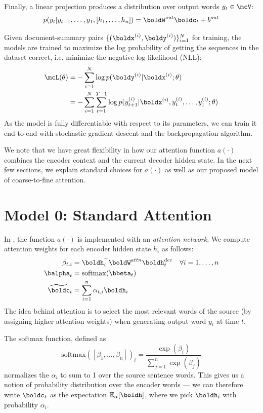 \documentclass[12pt]{report}
\begin{document}
Finally, a linear projection produces a distribution over output words $y_t \in \mcV$:
\begin{equation}
p(y_t | y_{t-1}, \ldots, y_1, [h_1, \ldots, h_n]) = \boldW^{out}\boldc_t + b^{out}
\end{equation}

Given document-summary pairs $\{ (\boldx^{(i)}, \boldy^{(i)}) \}_{i=1}^N$ for training, the models are trained to maximize the log probability of getting the sequences in the dataset correct, i.e. minimize the negative log-likelihood (NLL):
\begin{align*}
\mcL(\theta) &= - \sum_{i=1}^N \log p(\boldy^{(i)} | \boldx^{(i)}; \theta)  \\
&= -\sum_{i=1}^N \sum_{t=1}^{T-1} \log p(y_{t+1}^{(i)} | \boldx^{(i)}, y_t^{(i)}, \ldots, y_1^{(i)} ; \theta)
\end{align*}
As the model is fully differentiable with respect to its parameters, we can train it end-to-end with stochastic gradient descent and the backpropagation algorithm.

We note that we have great flexibility in how our attention function $a(\cdot)$ combines the encoder context and the current decoder hidden state. In the next few sections, we explain standard choices for $a(\cdot)$ as well as our proposed model of coarse-to-fine attention.

\section{Model 0: Standard Attention}

In \citet{bahdanau2014neural}, the function $a(\cdot)$ is implemented with an \emph{attention network}. We compute attention weights for each encoder hidden state $h_i$ as follows:
\begin{align}
\beta_{t,i} &= \boldh_i^\top \boldW^{attn} \boldh_t^{dec} \quad \forall i = 1, \ldots, n\\
\balpha_t &= \mathrm{softmax}(\bbeta_t) \\
\widetilde{\boldc}_t &= \sum_{i=1}^n \alpha_{t,i} \boldh_i
\end{align}
The idea behind attention is to select the most relevant words of the source (by assigning higher attention weights) when generating output word $y_t$ at time $t$.

The $\mathrm{softmax}$ function, defined as
\begin{equation}
\mathrm{softmax}([\beta_1, \ldots, \beta_n])_i =  \frac{\exp(\beta_i)}{\sum_{j=1}^n \exp(\beta_j)}
\end{equation}
normalizes the $\alpha_i$ to sum to 1 over the source sentence words. This gives us a notion of probability distribution over the encoder words --- we can therefore write $\boldc_t$ as the expectation $\mathbb{E}_\alpha[\boldh]$, where we pick $\boldh_i$ with probability $\alpha_i$.
\end{document}
